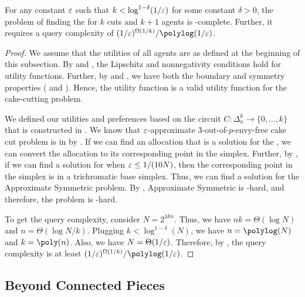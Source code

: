 \begin{theorem}
    For any constant $\varepsilon$ such that $k < \log^{1-\delta}(1/\varepsilon)$ for some constant $\delta > 0$, the problem of finding the \mccs{} for $k$ cuts and $k + 1$ agents is \PPAD-complete. Further, it requires a query complexity of $(1/\eps)^{\Omega(1/k)} / \polylog(1/\eps)$.
\end{theorem}
\begin{proof}
    We assume that the utilities of all agents are as defined at the beginning of this subsection. By  and , the Lipschitz and nonnegativity conditions hold for utility functions. Further, by  and , we have both the boundary and symmetry properties ( and ). Hence, the utility function is a valid utility function for the cake-cutting problem.

    
    We defined our utilities and preferences based on the circuit $C: \Delta^k_n \rightarrow \{0, \ldots, k\}$ that is constructed in . We know that $\varepsilon$-approximate 3-out-of-$p$-envy-free cake cut problem is in \PPAD{} by \cite{DBLP:journals/ior/DengQS12}. If we can find an allocation that is a solution for the \mccs, we can convert the allocation to its corresponding point in the simplex. Further, by , if we can find a solution for \mccs{} when $\varepsilon \leq 1/(10N)$, then the corresponding point in the simplex is in a trichromatic base simplex. Thus, we can find a solution for the \outofk Approximate Symmetric \Sperner problem. By , \outofk Approximate Symmetric \Sperner is \PPAD-hard, and therefore, the \mccs{} problem is \PPAD-hard.

    To get the query complexity, consider $N = 2^{4kn}$. Thus, we have $nk = \Theta(\log N)$ and $n = \Theta(\log N/ k)$. Plugging $k < \log^{1-\delta}(N)$, we have $n = \polylog(N)$ and $k = \poly(n)$. Also, we have $N = \Theta(1/\varepsilon)$. Therefore, by , the query complexity is at least $(1/\eps)^{\Omega(1/k)}/\polylog(1/\eps)$.
\end{proof}




\subsection{Beyond Connected Pieces}\label{sec:three-agents-non-contiguous}


